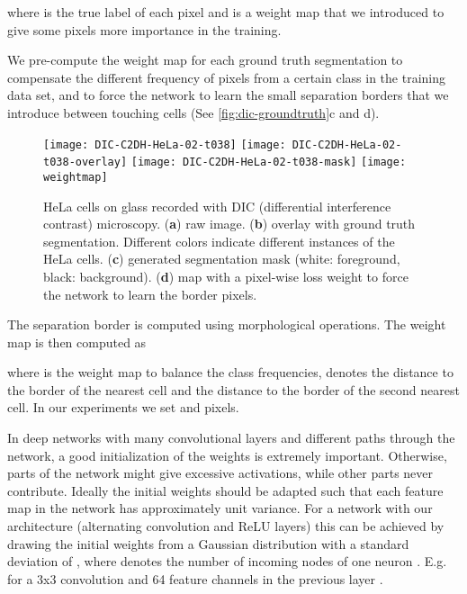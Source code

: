 \documentclass{llncs}
\begin{document}
where  is the true label of each pixel and  is a weight map that we introduced to give some pixels more importance in the training.

We pre-compute the weight map for each ground truth segmentation to compensate the different frequency of pixels from a certain class in the training data set, and to force the network to learn the small separation borders that we introduce between touching cells (See \autoref{fig:dic-groundtruth}c and d).
\begin{figure}[tbp]
  \centering
  \texttt{[image: DIC-C2DH-HeLa-02-t038]}
  \texttt{[image: DIC-C2DH-HeLa-02-t038-overlay]}
  \texttt{[image: DIC-C2DH-HeLa-02-t038-mask]}
  \texttt{[image: weightmap]}
  \caption{HeLa cells on glass recorded with DIC (differential interference contrast) microscopy. (\textbf{a}) raw image. (\textbf{b}) overlay with ground truth segmentation. Different colors indicate different instances of the HeLa cells. (\textbf{c}) generated segmentation mask (white: foreground, black: background). (\textbf{d}) map with a pixel-wise loss weight to force the network to learn the border pixels.}
  \label{fig:dic-groundtruth}

\end{figure}


 The separation border is computed using morphological operations. The weight map is then computed as

where   is the weight map to balance the class frequencies,  denotes the distance to the border of the nearest cell and  the distance to the border of the second nearest cell. In our experiments we set  and  pixels.

In deep networks with many convolutional layers and different paths through the network, a good initialization of the weights is extremely important. Otherwise, parts of the network might give excessive activations, while other parts never contribute. Ideally the initial weights should be adapted such that each feature map in the network has approximately unit variance. For a network with our architecture (alternating convolution and ReLU layers) this can be achieved by drawing the initial weights from a Gaussian distribution with a standard deviation of , where  denotes the number of incoming nodes of one neuron \cite{He2015}. E.g. for a 3x3 convolution and 64 feature channels in the previous layer .
\end{document}
